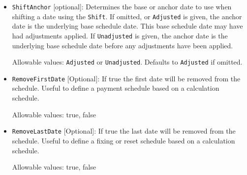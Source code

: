 \begin{itemize}
Allowable values: \lstinline!BusinessDays! or \lstinline!CalendarDays!. Defaults to \lstinline!BusinessDays! if omitted.

\item \lstinline!ShiftAnchor! [optional]:
Determines the base or anchor date to use when shifting a date using the \lstinline!Shift!.
If omitted, or \lstinline!Adjusted! is given, the anchor date is the underlying base schedule date.
This base schedule date may have had adjustments applied.
If \lstinline!Unadjusted! is given, the anchor date is the underlying base schedule date 
before any adjustments have been applied.

Allowable values: \lstinline!Adjusted! or \lstinline!Unadjusted!. Defaults to \lstinline!Adjusted! if omitted.

\item \lstinline!RemoveFirstDate! [Optional]: If true the first date will be removed from the schedule. Useful to define a payment schedule based on a calculation schedule.

Allowable values: true, false

\item \lstinline!RemoveLastDate! [Optional]: If true the last date will be removed from the schedule. Useful to define a fixing or reset schedule based on a calculation schedule.

Allowable values: true, false

\end{itemize}
